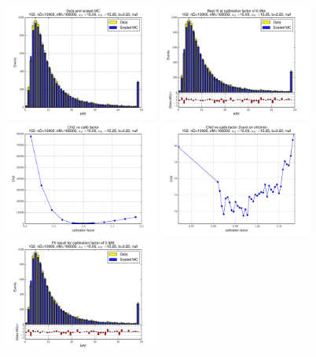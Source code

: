 
 \begin{figure}[htbp] \begin{center} 
\includegraphics[width=0.45\textwidth]{../FIGURES/102/FIG_Data_and_scaled_MC.pdf} 
\includegraphics[width=0.45\textwidth]{../FIGURES/102/FIG_Best_fit_at_calibration_factor_of_0_994.pdf} 
\includegraphics[width=0.45\textwidth]{../FIGURES/102/FIG_Chi2_vs_calib_factor.pdf} 
\includegraphics[width=0.45\textwidth]{../FIGURES/102/FIG_Chi2_vs_calib_factor_Zoom_on_chi2min.pdf} 
\includegraphics[width=0.45\textwidth]{../FIGURES/102/FIG_Fit_result_for_calibration_factor_of_0_989.pdf} 

\end{center}
\end{figure}

